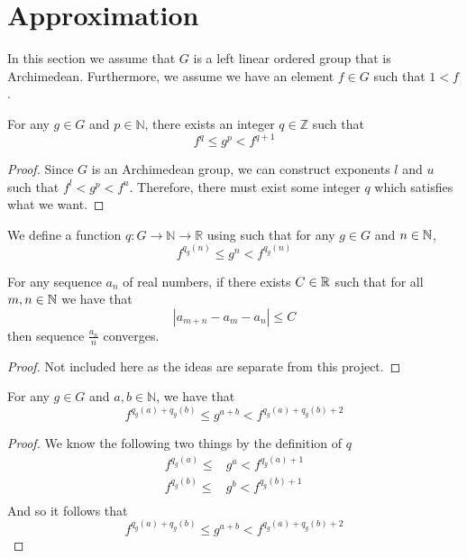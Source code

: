 \section{Approximation}
In this section we assume that $G$ is a left linear ordered group
that is Archimedean. Furthermore, we assume we have an element $f\in G$
such that $1 < f$.
\begin{theorem}\label{approximate}
    \leanok
    For any $g \in G$ and $p \in \mathbb{N}$,
    there exists an integer $q \in \mathbb{Z}$
    such that
    \[
        f^q \le g^p < f^{q+1}
    \]
\end{theorem}
\begin{proof}\leanok
Since $G$ is an Archimedean group, we can construct exponents $l$ and $u$
such that $f^l < g^p < f^u$. Therefore, there must exist some integer $q$
which satisfies what we want.
\end{proof}

\begin{definition}\label{def:q}
    \leanok{}
    We define a function $q \colon G \to \mathbb{N} \to \mathbb{R}$
    using  such that for any $g\in G$ and $n \in \mathbb{N}$,
    \[
        f^{q_g(n)} \le g^n < f^{q_g(n)}
    \]
\end{definition}

\begin{theorem}\label{sequence_convergence}
    \leanok
    For any sequence $a_n$ of real numbers,
    if there exists $C \in \mathbb{R}$ such that for all $m,n\in \mathbb{N}$
    we have that
    \[
        |a_{m+n} - a_m - a_n| \le C
    \]
    then sequence $\frac{a_n}{n}$ converges.
\end{theorem}
\begin{proof}\leanok
Not included here as the ideas
are separate from this project.
\end{proof}

\begin{theorem}\label{q_exp_add}
    \leanok{}
    For any $g \in G$ and $a,b \in \mathbb{N}$, we have that
    \[
        f^{q_g(a) + q_g(b)} \le g^{a+b} < f^{q_g(a) + q_g(b) + 2}
    \]
\end{theorem}
\begin{proof}\leanok
We know the following two things by the definition of $q$
\begin{align*}
f^{q_g(a)}\le &g^a < f^{q_g(a)+1}\\
f^{q_g(b)}\le &g^b < f^{q_g(b)+1}\\
\end{align*}
And so it follows that
\[
f^{q_g(a)+q_g(b)}\le g^{a+b} < f^{q_g(a)+q_g(b) + 2}
\]
\end{proof}

